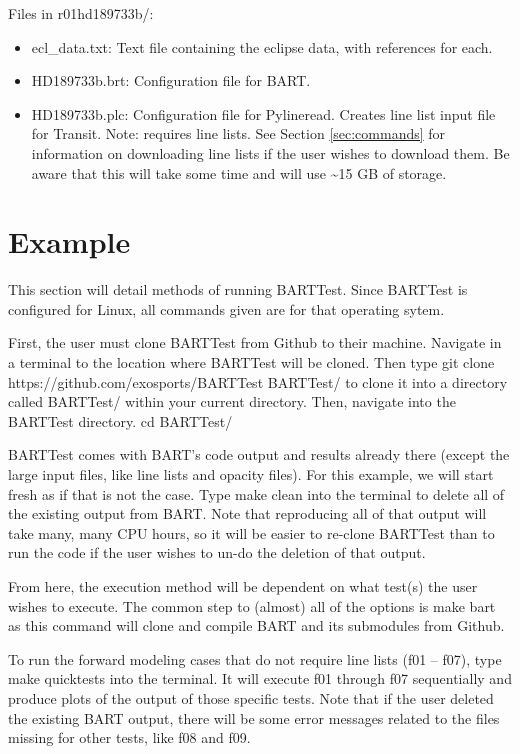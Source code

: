 \documentclass[letterpaper, 12pt]{article}
\begin{document}
Files in r01hd189733b/:
\begin{itemize} \itemsep0pt
  \item ecl_data.txt: Text file containing the eclipse data, with references for each.
  \item HD189733b.brt: Configuration file for BART.
  \item HD189733b.plc: Configuration file for Pylineread. Creates 
        line list input file for Transit. Note: requires line lists. See 
        Section \ref{sec:commands} for information on downloading line lists if 
        the user wishes to download them. Be aware that this will take some 
        time and will use {\sim}15 GB of storage.
\end{itemize}

\section{Example}
\label{sec:example}
This section will detail methods of running BARTTest. Since BARTTest is 
configured for Linux, all commands given are for that operating sytem.

First, the user must clone BARTTest from Github to their machine. 
Navigate in a terminal to the location where BARTTest will be cloned. 
Then type
\beginverbatim
git clone https://github.com/exosports/BARTTest BARTTest/
\endverbatim
to clone it into a directory called BARTTest/ within your current directory.
Then, navigate into the BARTTest directory.
\beginverbatim
cd BARTTest/
\endverbatim

BARTTest comes with BART's code output and results already there (except the large input files, like line lists and opacity files). For this example, we will start fresh as if that is not the case. Type
\beginverbatim
make clean
\endverbatim
into the terminal to delete all of the existing output from BART. Note that 
reproducing all of that output will take many, many CPU hours, so it will 
be easier to re-clone BARTTest than to run the code if the user wishes to 
un-do the deletion of that output.

From here, the execution method will be dependent on what test(s) the user 
wishes to execute. The common step to (almost) all of the options is
\beginverbatim
make bart
\endverbatim
as this command will clone and compile BART and its submodules from Github. 

To run the forward modeling cases that do not require line lists (f01 
-- f07), type
\beginverbatim
make quicktests
\endverbatim
into the terminal. It will execute f01 through f07 sequentially and produce 
plots of the output of those specific tests. Note that if the user deleted 
the existing BART output, there will be some error messages related to the 
files missing for other tests, like f08 and f09.
\end{document}
